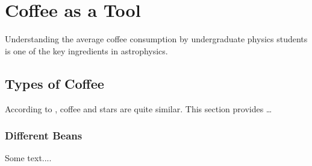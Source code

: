 
\chapter{Coffee as a Tool}
\label{chap:coffee}

Understanding the average coffee consumption by undergraduate physics students
is one of the key ingredients in astrophysics.

\section{Types of Coffee}
\label{sec:intro_coffee}

According to \textcite{kww}, coffee and stars are quite similar. This section
provides \ldots

\lipsum


\subsection{Different Beans}
\label{sec:intro_coffee_beans}

Some text.... 

\lipsum
